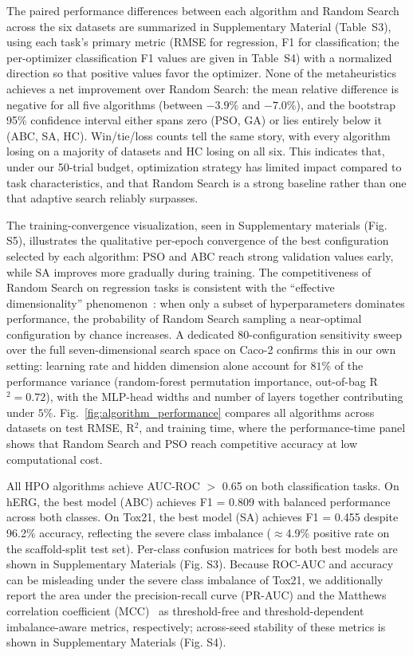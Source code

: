 \documentclass[journal]{IEEEtran}
\begin{document}
The paired performance differences between each algorithm and Random Search across the six datasets are summarized in Supplementary Material (Table~S3), using each task's primary metric (RMSE for regression, F1 for classification; the per-optimizer classification F1 values are given in Table~S4) with a normalized direction so that positive values favor the optimizer. None of the metaheuristics achieves a net improvement over Random Search: the mean relative difference is negative for all five algorithms (between $-3.9\%$ and $-7.0\%$), and the bootstrap 95\% confidence interval either spans zero (PSO, GA) or lies entirely below it (ABC, SA, HC). Win/tie/loss counts tell the same story, with every algorithm losing on a majority of datasets and HC losing on all six. This indicates that, under our 50-trial budget, optimization strategy has limited impact compared to task characteristics, and that Random Search is a strong baseline rather than one that adaptive search reliably surpasses.

The training-convergence visualization, seen in Supplementary materials (Fig. S5), illustrates the qualitative per-epoch convergence of the best configuration selected by each algorithm: PSO and ABC reach strong validation values early, while SA improves more gradually during training. The competitiveness of Random Search on regression tasks is consistent with the ``effective dimensionality'' phenomenon~\cite{bergstra2012random}: when only a subset of hyperparameters dominates performance, the probability of Random Search sampling a near-optimal configuration by chance increases. A dedicated 80-configuration sensitivity sweep over the full seven-dimensional search space on Caco-2 confirms this in our own setting: learning rate and hidden dimension alone account for $81\%$ of the performance variance (random-forest permutation importance, out-of-bag R$^2 = 0.72$), with the MLP-head widths and number of layers together contributing under $5\%$. Fig.~\ref{fig:algorithm_performance} compares all algorithms across datasets on test RMSE, R$^2$, and training time, where the performance-time panel shows that Random Search and PSO reach competitive accuracy at low computational cost.

All HPO algorithms achieve AUC-ROC $>$ 0.65 on both classification tasks. On hERG, the best model (ABC) achieves F1 = 0.809 with balanced performance across both classes. On Tox21, the best model (SA) achieves F1 = 0.455 despite 96.2\% accuracy, reflecting the severe class imbalance ($\approx$4.9\% positive rate on the scaffold-split test set). Per-class confusion matrices for both best models are shown in Supplementary Materials (Fig. S3). Because ROC-AUC and accuracy can be misleading under the severe class imbalance of Tox21, we additionally report the area under the precision-recall curve (PR-AUC) and the Matthews correlation coefficient (MCC)~\cite{chicco2020mcc} as threshold-free and threshold-dependent imbalance-aware metrics, respectively; across-seed stability of these metrics is shown in Supplementary Materials (Fig. S4).
\end{document}
